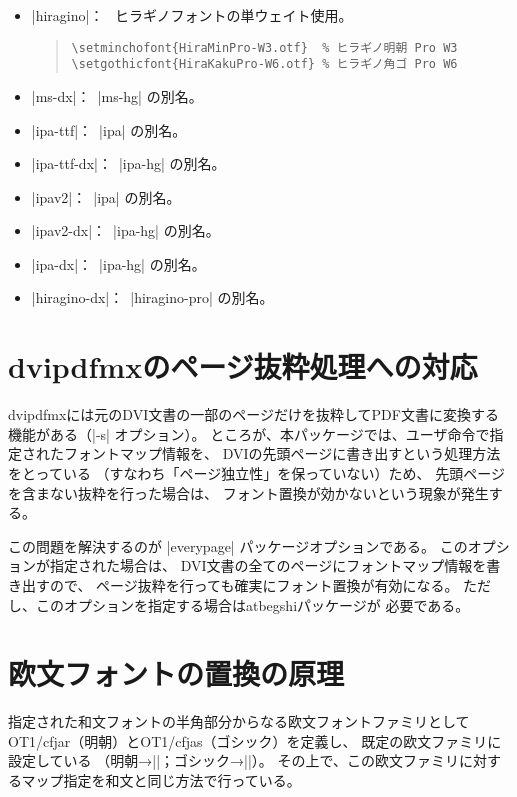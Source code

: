 \documentclass[a4paper,uplatex]{jsarticle}
\newcommand{\Pkg}[1]{\textsf{#1}}
\newcommand{\Means}{：\ }
\begin{document}
\begin{itemize}
\item |hiragino|\Means
  ヒラギノフォントの単ウェイト使用。
\begin{quote}\small\begin{verbatim}
\setminchofont{HiraMinPro-W3.otf}  % ヒラギノ明朝 Pro W3
\setgothicfont{HiraKakuPro-W6.otf} % ヒラギノ角ゴ Pro W6
\end{verbatim}\end{quote}

\item |ms-dx|\Means |ms-hg| の別名。
\item |ipa-ttf|\Means |ipa| の別名。
\item |ipa-ttf-dx|\Means |ipa-hg| の別名。
\item |ipav2|\Means |ipa| の別名。
\item |ipav2-dx|\Means |ipa-hg| の別名。
\item |ipa-dx|\Means |ipa-hg| の別名。
\item |hiragino-dx|\Means |hiragino-pro| の別名。
\end{itemize}

\section{dvipdfmxのページ抜粋処理への対応}

dvipdfmxには元のDVI文書の一部のページだけを抜粋してPDF文書に変換する
機能がある（|-s| オプション）。
ところが、本パッケージでは、ユーザ命令で指定されたフォントマップ情報を、
DVIの先頭ページに書き出すという処理方法をとっている
（すなわち「ページ独立性」を保っていない）ため、
先頭ページを含まない抜粋を行った場合は、
フォント置換が効かないという現象が発生する。

この問題を解決するのが |everypage| パッケージオプションである。
このオプションが指定された場合は、
DVI文書の全てのページにフォントマップ情報を書き出すので、
ページ抜粋を行っても確実にフォント置換が有効になる。
ただし、このオプションを指定する場合は\Pkg{atbegshi}パッケージが
必要である。

\section{欧文フォントの置換の原理}
\label{sec:Mechanism-Alph}

指定された和文フォントの半角部分からなる欧文フォントファミリとして
OT1/cfjar（明朝）とOT1/cfjas（ゴシック）を定義し、
既定の欧文ファミリに設定している
（明朝→|\rmdefault|；ゴシック→|\sfdefault|）。
その上で、この欧文ファミリに対するマップ指定を和文と同じ方法で行っている。
\end{document}

